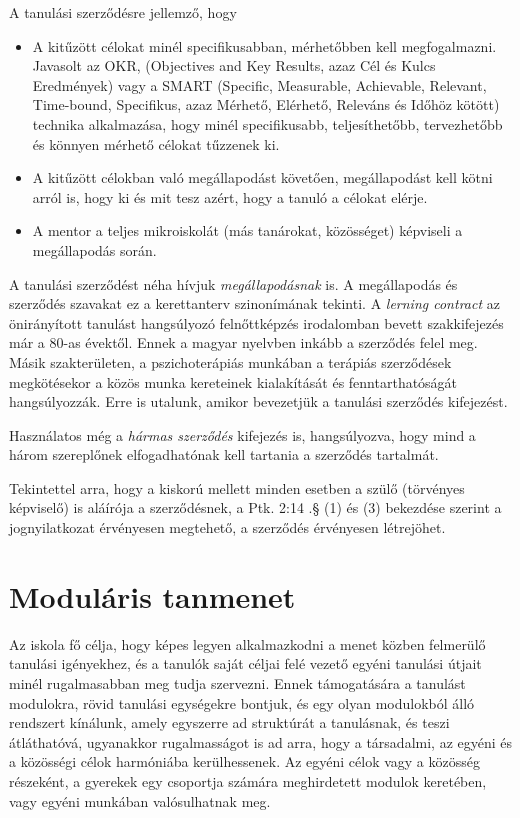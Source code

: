 A tanulási szerződésre jellemző, hogy
\begin{itemize}
\item A kitűzött célokat minél specifikusabban, mérhetőbben kell megfogalmazni. Javasolt az OKR,  (Objectives and Key Results, azaz  Cél és Kulcs Eredmények)\cite{okr} vagy a SMART (Specific, Measurable, Achievable, Relevant, Time-bound, Specifikus, azaz Mérhető, Elérhető, Releváns és Időhöz kötött)\cite{wiki:smart} technika alkalmazása, hogy minél specifikusabb, teljesíthetőbb, tervezhetőbb és könnyen mérhető célokat tűzzenek ki.

\item A kitűzött célokban való megállapodást követően, megállapodást  kell kötni arról is, hogy ki és mit tesz azért, hogy a tanuló a célokat elérje.

\item A mentor a teljes mikroiskolát (más tanárokat, közösséget) képviseli a megállapodás során.
\end{itemize}

A tanulási szerződést néha hívjuk \emph{megállapodásnak} is. A megállapodás és szerződés szavakat ez a kerettanterv szinonímának tekinti. A \emph{lerning contract} az önirányított tanulást hangsúlyozó felnőttképzés irodalomban
bevett szakkifejezés már a 80-as évektől\cite{Malcolm77}. Ennek a magyar nyelvben inkább a szerződés felel meg. Másik szakterületen, a pszichoterápiás munkában a terápiás szerződések megkötésekor a közös munka kereteinek kialakítását és fenntarthatóságát hangsúlyozzák.\cite{pszichoterapia} Erre is utalunk, amikor bevezetjük a tanulási szerződés kifejezést.

 Használatos még a \emph{hármas szerződés} kifejezés is, hangsúlyozva, hogy mind a három szereplőnek elfogadhatónak kell tartania a szerződés tartalmát.

Tekintettel arra, hogy a kiskorú mellett minden esetben a szülő (törvényes képviselő) is aláírója a szerződésnek, a Ptk. 2:14 .§ (1) és (3) bekezdése szerint a jognyilatkozat érvényesen megtehető, a szerződés érvényesen létrejöhet.

\section{Moduláris tanmenet}

Az iskola fő célja, hogy képes legyen alkalmazkodni a menet közben felmerülő tanulási igényekhez, és a tanulók saját céljai felé vezető egyéni tanulási útjait minél rugalmasabban meg tudja szervezni. Ennek támogatására a tanulást modulokra, rövid tanulási egységekre bontjuk, és egy olyan modulokból álló rendszert kínálunk, amely egyszerre ad struktúrát a tanulásnak, és teszi átláthatóvá, ugyanakkor rugalmasságot is ad arra, hogy a társadalmi, az egyéni és a közösségi célok harmóniába kerülhessenek. Az egyéni célok vagy a közösség részeként, a gyerekek egy csoportja számára meghirdetett modulok keretében, vagy egyéni munkában valósulhatnak meg.


